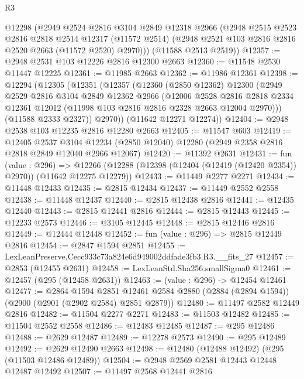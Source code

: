 \begin{lexlean}{R3}
\begin{coremodule}
      @12298
      (@2949
        @2524
        @2816
        @3104
        @2849
        @12318
        @2966
        (@2948
          @2515
          @2523
          @2816
          @2818
          @2514
          @12317
          (@11572 @2514)
          (@2948 @2521 @103 @2816 @2816 @2520 @2663 (@11572 @2520) @2970)))
      (@11588 @2513 @2519))
@12357 := @2948 @2531 @103 @12226 @2816 @12300 @2663
@12360 := @11548 @2530 @11447 @12225
@12361 := @11985 @2663
@12362 := @11986 @12361
@12398 := @12294
    (@12305
      (@12351
        (@12357
          (@12360
            (@2850 @12362)
            @12300
            (@2949
              @2529
              @2816
              @3104
              @2849
              @12362
              @2966
              (@12006
                @2528
                @2816
                @2818
                @2334
                @12361
                @12012
                (@11998 @103 @2816 @2816 @2328 @2663 @12004 @2970)))
            (@11588 @2333 @2327))
          @2970))
      (@11642 @12271 @12274))
@12404 := @2948 @2538 @103 @12235 @2816 @12280 @2663
@12405 := @11547 @603
@12419 := @12405
    @2537
    @3104
    @12234
    (@2850 @12040)
    @12280
    (@2949 @2358 @2816 @2818 @2849 @12040 @2966 @12067)
@12420 := @11392 @2631
@12431 := fun (value : @296) =>
  @12266 (@12288 (@12398 (@12404 (@12419 (@12420 @2354)) @2970)) (@11642 @12275 @12279))
@12433 := @11449 @2277 @2271
@12434 := @11448 @12433
@12435 := @2815 @12434
@12437 := @11449 @2552 @2558
@12438 := @11448 @12437
@12440 := @2815 @12438 @2816
@12441 := @12435 @12440
@12443 := @2815 @12441 @2816
@12444 := @2815 @12443
@12445 := @12233 @2573
@12446 := @3105 @12445
@12448 := @2815 @12446 @2816
@12449 := @12444 @12448
@12452 := fun (value : @296) => @2815 @12449 @2816
@12454 := @2847 @1594 @2851
@12455 := LexLeanPreserve.Cecc933c73a824e6d949002ddfade3fb3.R3.__fits_27
@12457 := @2853 (@12455 @2631)
@12458 := LexLeanStd.Sha256.smallSigma0
@12461 := @12457 (@295 (@12458 @2631))
@12463 := (value : @296) -> @12454 @12461
@12477 := @2864
    @1594
    @2851
    @12461
    @2584
    @2880
    (@2884 (@2894 @1594))
    (@2900 (@2901 (@2902 @2584) @2851 @2879))
@12480 := @11497 @2582 @12449 @2816
@12482 := @11504 @2277 @2271
@12483 := @11503 @12482
@12485 := @11504 @2552 @2558
@12486 := @12483 @12485
@12487 := @295 @12486
@12488 := @2629 @12487
@12489 := @12278 @2573
@12490 := @295 @12489
@12492 := @2629 @12490 @2663
@12498 := @12480 (@12488 @12492) (@295 (@11503 @12486 @12489))
@12504 := @2948 @2569 @2581 @12443 @12448 @12487 @12492
@12507 := @11497 @2568 @12441 @2816

\end{coremodule}
\end{lexlean}
